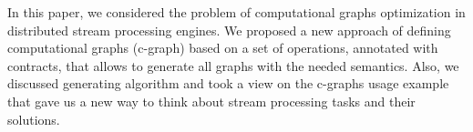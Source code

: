 In this paper, we considered the problem of computational graphs optimization in distributed stream processing engines.
We proposed a new approach of defining computational graphs (c-graph) based on a set of operations, annotated with contracts, that allows to generate all graphs with the needed semantics.
Also, we discussed generating algorithm and took a view on the c-graphs usage example that gave us a new way to think about stream processing tasks and their solutions.
